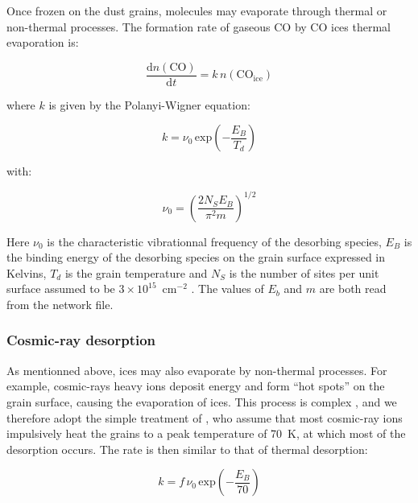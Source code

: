 \documentclass[a4paper,12pt]{article}
\newcommand{\conc}[1]{n(\mathrm{#1})}
\begin{document}
Once frozen on the dust grains, molecules may evaporate through
thermal or non-thermal processes. The formation rate of gaseous CO by
CO ices thermal evaporation is:

\begin{equation}
  \frac{\mathrm{d}\conc{CO}}{\mathrm{d}t} = k \, \conc{CO_{ice}}
\end{equation}

\noindent
where $k$ is given by the Polanyi-Wigner equation:

\begin{equation}
  k = \nu_{0} \, \mathrm{exp} \left( - \frac{E_{B}}{T_{d}} \right)
  \label{eq:thermal-desorption}
\end{equation}

\noindent
with:

\begin{equation}
  \nu_{0} = \left( \frac{2 N_{S} E_{B}}{\pi^2 m} \right)^{1/2}
  \label{eq:vibration-freq}
\end{equation}

\noindent
Here $\nu_{0}$ is the characteristic vibrationnal frequency of the
desorbing species, $E_{B}$ is the binding energy of the desorbing
species on the grain surface expressed in Kelvins, $T_{d}$ is the
grain temperature and $N_{S}$ is the number of sites per unit surface
assumed to be $3 \times 10^{15}$~cm$^{-2}$ \citep{Hasegawa92}. The
values of $E_{b}$ and $m$ are both read from the network file.

\subsubsection{Cosmic-ray desorption}
\label{sec:cosm-ray-desorpt}

As mentionned above, ices may also evaporate by non-thermal
processes. For example, cosmic-rays heavy ions deposit energy and form
``hot spots'' on the grain surface, causing the evaporation of
ices. This process is complex \citep[see e.g.][]{Bringa04}, and we
therefore adopt the simple treatment of \citet{Hasegawa93}, who assume
that most cosmic-ray ions impulsively heat the grains to a peak
temperature of 70~K, at which most of the desorption occurs. The rate
is then similar to that of thermal desorption:

\begin{equation}
  k = f \, \nu_{0} \, \mathrm{exp} \left( -\frac{E_{B}}{70} \right)
  \label{eq:cosmic-ray-desorption}
\end{equation}
\end{document}

